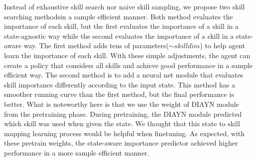 Instead of exhaustive skill search nor naive skill sampling, we propose two skill searching methodsin a sample efficient manner.
Both method evaluates the importance of each skill, but the first evaluates the importance of a skill in a state-agnostic way
while the second evaluates the importance of a skill in a state-aware way.
The first method adds tens of parameters($\sim skilldim$) to help agent learn the importance of each skill. With these simple adjustments, the agent can create a policy that considers all skills and achieve good performance in a sample efficient way.
The second method is to add a neural net module that evaluates  skill importance differently according to the input state.
This method has a smoother running curve than the first method, but the final performance is better.
What is noteworthy here is that we use the weight of DIAYN module from the pretraining phase.
During pretraining, the DIAYN module predicted which skill was used when given the state. We thought that this state to skill mapping learning process would be helpful when finetuning.
As expected, with these pretrain weights, the state-aware importance predictor achieved higher performance in a more sample efficient manner.

